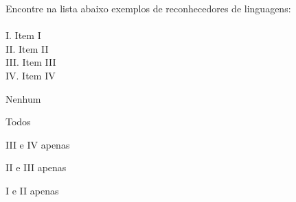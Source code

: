 \question[10]
Encontre na lista abaixo exemplos de reconhecedores de linguagens:\\
\\
I. Item I\\
II. Item II\\
III. Item III\\
IV. Item IV
\\
\begin{choices}
\item Nenhum %
\item Todos
\item III e IV apenas
\item II e III apenas
\item I e II apenas
\end{choices}
\answerline

